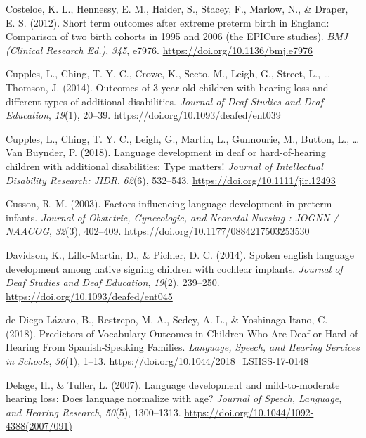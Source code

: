 \documentclass[english,man]{apa6}
\begin{document}
\leavevmode\hypertarget{ref-costeloe2012}{}%
Costeloe, K. L., Hennessy, E. M., Haider, S., Stacey, F., Marlow, N., \& Draper, E. S. (2012). Short term outcomes after extreme preterm birth in England: Comparison of two birth cohorts in 1995 and 2006 (the EPICure studies). \emph{BMJ (Clinical Research Ed.)}, \emph{345}, e7976. \url{https://doi.org/10.1136/bmj.e7976}

\leavevmode\hypertarget{ref-cupples2014}{}%
Cupples, L., Ching, T. Y. C., Crowe, K., Seeto, M., Leigh, G., Street, L., \ldots{} Thomson, J. (2014). Outcomes of 3-year-old children with hearing loss and different types of additional disabilities. \emph{Journal of Deaf Studies and Deaf Education}, \emph{19}(1), 20--39. \url{https://doi.org/10.1093/deafed/ent039}

\leavevmode\hypertarget{ref-cupples2018}{}%
Cupples, L., Ching, T. Y. C., Leigh, G., Martin, L., Gunnourie, M., Button, L., \ldots{} Van Buynder, P. (2018). Language development in deaf or hard-of-hearing children with additional disabilities: Type matters! \emph{Journal of Intellectual Disability Research: JIDR}, \emph{62}(6), 532--543. \url{https://doi.org/10.1111/jir.12493}

\leavevmode\hypertarget{ref-cusson2003}{}%
Cusson, R. M. (2003). Factors influencing language development in preterm infants. \emph{Journal of Obstetric, Gynecologic, and Neonatal Nursing : JOGNN / NAACOG}, \emph{32}(3), 402--409. \url{https://doi.org/10.1177/0884217503253530}

\leavevmode\hypertarget{ref-davidson2014}{}%
Davidson, K., Lillo-Martin, D., \& Pichler, D. C. (2014). Spoken english language development among native signing children with cochlear implants. \emph{Journal of Deaf Studies and Deaf Education}, \emph{19}(2), 239--250. \url{https://doi.org/10.1093/deafed/ent045}

\leavevmode\hypertarget{ref-dediego-lazaro2018}{}%
de Diego-Lázaro, B., Restrepo, M. A., Sedey, A. L., \& Yoshinaga-Itano, C. (2018). Predictors of Vocabulary Outcomes in Children Who Are Deaf or Hard of Hearing From Spanish-Speaking Families. \emph{Language, Speech, and Hearing Services in Schools}, \emph{50}(1), 1--13. \url{https://doi.org/10.1044/2018_LSHSS-17-0148}

\leavevmode\hypertarget{ref-delage2007}{}%
Delage, H., \& Tuller, L. (2007). Language development and mild-to-moderate hearing loss: Does language normalize with age? \emph{Journal of Speech, Language, and Hearing Research}, \emph{50}(5), 1300--1313. \url{https://doi.org/10.1044/1092-4388(2007/091)}
\end{document}
